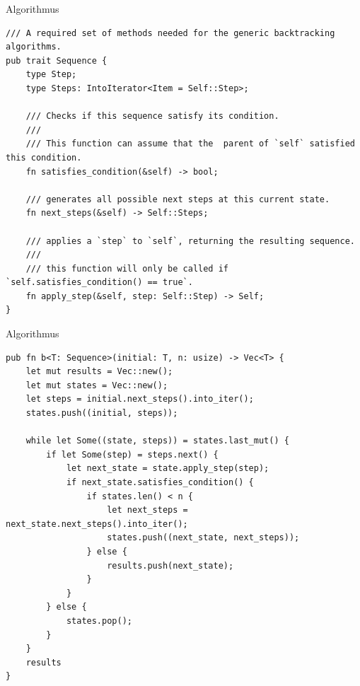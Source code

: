 \documentclass[aspectratio=43,t]{beamer}
\begin{document}
  \begin{frame}[fragile]{Algorithmus}
    \begin{verbatim}
/// A required set of methods needed for the generic backtracking algorithms.
pub trait Sequence {
    type Step;
    type Steps: IntoIterator<Item = Self::Step>;

    /// Checks if this sequence satisfy its condition.
    ///
    /// This function can assume that the  parent of `self` satisfied this condition.
    fn satisfies_condition(&self) -> bool;

    /// generates all possible next steps at this current state.
    fn next_steps(&self) -> Self::Steps;

    /// applies a `step` to `self`, returning the resulting sequence.
    ///
    /// this function will only be called if `self.satisfies_condition() == true`.
    fn apply_step(&self, step: Self::Step) -> Self;
}

      \end{verbatim}
    \end{frame}
    \begin{frame}[fragile]{Algorithmus}
      \begin{verbatim}
pub fn b<T: Sequence>(initial: T, n: usize) -> Vec<T> {
    let mut results = Vec::new();
    let mut states = Vec::new();
    let steps = initial.next_steps().into_iter();
    states.push((initial, steps));

    while let Some((state, steps)) = states.last_mut() {
        if let Some(step) = steps.next() {
            let next_state = state.apply_step(step);
            if next_state.satisfies_condition() {
                if states.len() < n {
                    let next_steps = next_state.next_steps().into_iter();
                    states.push((next_state, next_steps));
                } else {
                    results.push(next_state);
                }
            }
        } else {
            states.pop();
        }
    }
    results
}
    \end{verbatim}
  \end{frame}
\end{document}
